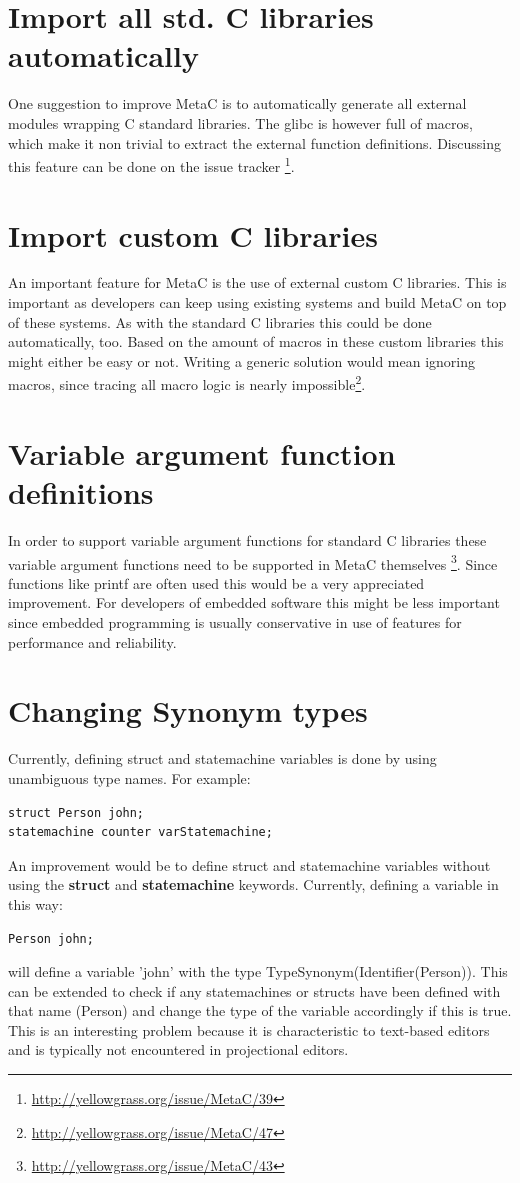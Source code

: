 \documentclass[a4paper,10pt,titlepage]{report}
\begin{document}
\section{Import all std. C libraries automatically}
One suggestion to improve MetaC is to automatically generate all external modules wrapping C standard libraries. The glibc is however full of macros, which make it non trivial to extract the external function definitions. Discussing this feature can be done on the issue tracker \footnote{\url{http://yellowgrass.org/issue/MetaC/39}}.

\section{Import custom C libraries}
An important feature for MetaC is the use of external custom C libraries. This is important as developers can keep using existing systems and build MetaC on top of these systems. As with the standard C libraries this could be done automatically, too. Based on the amount of macros in these custom libraries this might either be easy or not. Writing a generic solution would mean ignoring macros, since tracing all macro logic is nearly impossible\footnote{\url{http://yellowgrass.org/issue/MetaC/47}}.

\section{Variable argument function definitions}
In order to support variable argument functions for standard C libraries these variable argument functions need to be supported in MetaC themselves \footnote{\url{http://yellowgrass.org/issue/MetaC/43}}. Since functions like printf are often used this would be a very appreciated improvement. For developers of embedded software this might be less important since embedded programming is usually conservative in use of features for performance and reliability.

\section{Changing Synonym types}
Currently, defining struct and statemachine variables is done by using unambiguous type names. For example:
\begin{lstlisting}
struct Person john;
statemachine counter varStatemachine;
\end{lstlisting}
An improvement would be to define struct and statemachine variables without using the \textbf{struct} and \textbf{statemachine} keywords. Currently, defining a variable in this way: 
\begin{lstlisting}
Person john;
\end{lstlisting} 
will define a variable 'john' with the type TypeSynonym(Identifier(Person)). This can be extended to check if any statemachines or structs have been defined with that name (Person) and change the type of the variable accordingly if this is true. This is an interesting problem because it is characteristic to text-based editors and is typically not encountered in projectional editors.
\end{document}
